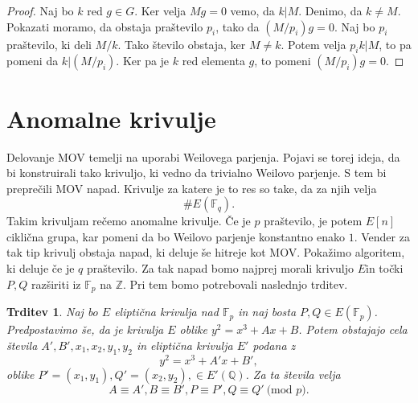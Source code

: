 \documentclass[12pt,a4paper,twoside]{article}
\theoremstyle{definition} %
\theoremstyle{plain} %
\newtheorem{trditev}[definicija]{Trditev}
\numberwithin{equation}{section}  %
\newcommand{\Z}{\mathbb Z}
\newcommand{\Q}{\mathbb Q}
\newcommand{\F}{\mathbb F}
\newcommand{\E}[1]{E({#1})}
\newcommand{\MOD}[1]{\ \text{(mod }{#1}\text{)}}
\begin{document}
\begin{proof}

Naj bo $k$ red $g\in G$. Ker velja $Mg = 0$ vemo, da $k|M$. Denimo, da $k \neq M$. Pokazati moramo, da obstaja praštevilo $p_i$, tako da $(M/p_i)g = 0$. Naj bo $p_i$ praštevilo, ki deli $M/k$. Tako število obstaja, ker $M \neq k$. Potem velja $p_ik|M$, to pa pomeni da $k|(M/p_i)$. Ker pa je $k$ red elementa $g$, to pomeni $(M/p_i)g = 0$.

\end{proof}


\section{Anomalne krivulje}

Delovanje MOV temelji na uporabi Weilovega parjenja. Pojavi se torej ideja, da bi konstruirali tako krivuljo, ki vedno da trivialno Weilovo parjenje. S tem bi preprečili MOV napad. Krivulje za katere je to res so take, da za njih velja
$$\#\E{\F_q}.$$
Takim krivuljam rečemo anomalne krivulje. Če je $p$ praštevilo, je potem $E[n]$ ciklična grupa, kar pomeni da bo Weilovo parjenje konstantno enako $1$. Vender za tak tip krivulj obstaja napad, ki deluje še hitreje kot MOV.
Pokažimo algoritem, ki deluje če je $q$ praštevilo.
Za tak napad bomo najprej morali krivuljo $E$in točki $P,Q$ razširiti iz $\F_p$ na $\Z$. Pri tem bomo potrebovali naslednjo trditev.

\begin{trditev}
\label{trd:5.6}
Naj bo $E$ eliptična krivulja nad $\F_p$ in naj bosta $P,Q \in \E{\F_p}$. Predpostavimo še, da je krivulja $E$ oblike $y^2=x^3+Ax+B$. Potem obstajajo cela števila
$A',B',x_1,x_2,y_1,y_2$ in eliptična krivulja $E'$ podana z
$$y^2=x^3+A'x+B',$$
oblike $P'=(x_1,y_1),Q'=(x_2,y_2), \in E'(\Q)$.
Za ta števila velja
$$A\equiv A',B \equiv B', P \equiv P', Q \equiv Q' \MOD{p}.$$

\end{trditev}
\end{document}
